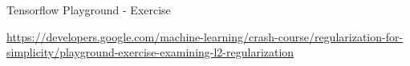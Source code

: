 \begin{frame}{Tensorflow Playground - Exercise}
  \begin{figure}
    \centering
  \end{figure}
  \scriptsize
  \url{https://developers.google.com/machine-learning/crash-course/regularization-for-simplicity/playground-exercise-examining-l2-regularization}
\end{frame}


\endlecture
